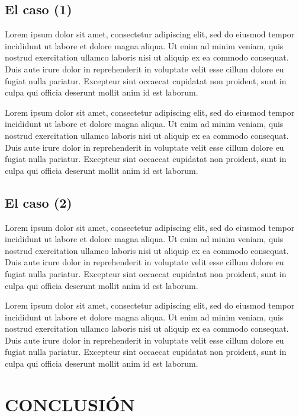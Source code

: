 \documentclass[12pt]{article} %
\begin{document}
\subsection{El caso (1)}

Lorem ipsum dolor sit amet, consectetur adipiscing elit, sed do eiusmod tempor incididunt ut labore et dolore magna aliqua. Ut enim ad minim veniam, quis nostrud exercitation ullamco laboris nisi ut aliquip ex ea commodo consequat. Duis aute irure dolor in reprehenderit in voluptate velit esse cillum dolore eu fugiat nulla pariatur. Excepteur sint occaecat cupidatat non proident, sunt in culpa qui officia deserunt mollit anim id est laborum.

Lorem ipsum dolor sit amet, consectetur adipiscing elit, sed do eiusmod tempor incididunt ut labore et dolore magna aliqua. Ut enim ad minim veniam, quis nostrud exercitation ullamco laboris nisi ut aliquip ex ea commodo consequat. Duis aute irure dolor in reprehenderit in voluptate velit esse cillum dolore eu fugiat nulla pariatur. Excepteur sint occaecat cupidatat non proident, sunt in culpa qui officia deserunt mollit anim id est laborum.


\subsection{El caso (2)}


Lorem ipsum dolor sit amet, consectetur adipiscing elit, sed do eiusmod tempor incididunt ut labore et dolore magna aliqua. Ut enim ad minim veniam, quis nostrud exercitation ullamco laboris nisi ut aliquip ex ea commodo consequat. Duis aute irure dolor in reprehenderit in voluptate velit esse cillum dolore eu fugiat nulla pariatur. Excepteur sint occaecat cupidatat non proident, sunt in culpa qui officia deserunt mollit anim id est laborum.

Lorem ipsum dolor sit amet, consectetur adipiscing elit, sed do eiusmod tempor incididunt ut labore et dolore magna aliqua. Ut enim ad minim veniam, quis nostrud exercitation ullamco laboris nisi ut aliquip ex ea commodo consequat. Duis aute irure dolor in reprehenderit in voluptate velit esse cillum dolore eu fugiat nulla pariatur. Excepteur sint occaecat cupidatat non proident, sunt in culpa qui officia deserunt mollit anim id est laborum.

\clearpage



\section{CONCLUSIÓN}
\end{document}
